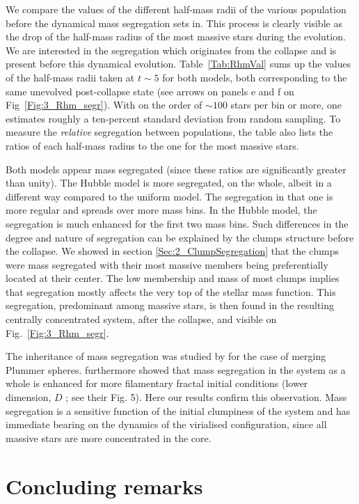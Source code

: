 We compare the values of the different half-mass radii of the various population before the dynamical mass segregation sets in. This process is clearly visible as the drop of the half-mass radius of the most massive stars during the evolution. We are interested in the segregation which originates from the collapse and is present before this dynamical evolution. Table~\ref{Tab:RhmVal} sums up the values of the half-mass radii taken at $t\sim5$ for both models, both corresponding to the same unevolved post-collapse state (see arrows on panels e and f on Fig~\ref{Fig:3_Rhm_segr}). With on the order of $\sim 100$ stars per bin or more, one estimates roughly a ten-percent standard deviation from random sampling. To measure the \textit{relative} segregation between populations, the table also lists the ratios of each half-mass radius to the one for the most massive stars. 

Both models appear mass segregated (since these ratios are significantly greater than unity). The Hubble model is more segregated, on the whole, albeit in a different way compared to the uniform model. The segregation in that one is more regular and spreads over more mass bins. In the Hubble model, the segregation is much enhanced for the first two mass bins. Such differences in the degree and nature of segregation can be explained by the clumps structure before the collapse. We showed in section \ref{Sec:2_ClumpSegregation} that the clumps were mass segregated with their most massive members being preferentially located at their center. The low membership and mass of most clumps implies that segregation mostly affects the very top of the stellar mass function. This segregation, predominant among massive stars, is then found in the resulting centrally concentrated system, after the collapse, and visible on Fig.~\ref{Fig:3_Rhm_segr}. 

The inheritance of mass segregation was studied by \cite{McMillan2007} for the case of merging Plummer spheres. \cite{Allison2010} furthermore showed that mass segregation in the system as a whole is enhanced for more filamentary  fractal initial conditions (lower dimension, $D$ ; see their Fig. 5). Here our results confirm this observation. Mass segregation is a sensitive function of the initial clumpiness of the system and has immediate bearing on the dynamics of the virialised configuration, since all massive stars are more concentrated in the core.


\section{Concluding remarks}


